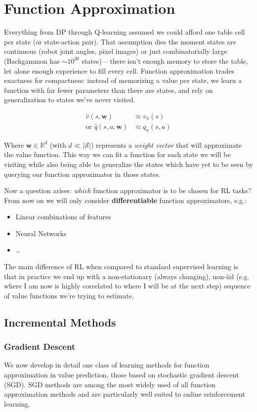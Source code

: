 \section{Function Approximation}
Everything from DP through Q-learning assumed we could afford one table cell per state (or state-action pair). That assumption dies the moment states are continuous (robot joint angles, pixel images) or just combinatorially large (Backgammon has $\sim 10^20$ states) -- there isn't enough memory to store the table, let alone enough experience to fill every cell. Function approximation trades exactness for compactness: instead of memorizing a value per state, we learn a function with far fewer parameters than there are states, and rely on generalization to states we've never visited.

\begin{align*}
    \hat{v}(s,\mathbf{w}) &\approx v_\pi(s) \\
    \text{or }\hat{q}(s, a, \mathbf{w}) &\approx q_\pi(s,a)
\end{align*}

Where $\mathbf{w} \in \mathbb{R}^d$ (with $d \ll \lvert \mathcal{S}\rvert$) represents a \emph{weight vector} that will approximate the value function. This way we can fit a function for each state we will be visiting while also being able to generalize the states which have yet to be seen by querying our function approximator in those states.

Now a question arises: \emph{which} function approximator is to be chosen for RL tasks? From now on we will only consider \textbf{differentiable} function approximators, e.g.:
\begin{itemize}
    \item Linear combinations of features
    \item Neural Networks
    \item \dots
\end{itemize}

The main difference of RL when compared to standard supervised learning is that in practice we end up with a non-stationary (always changing), non-iid (e.g. where I am now is highly correlated to where I will be at the next step) sequence of value functions we're trying to estimate.

\subsection{Incremental Methods}\label{sec:incremental-methods}
\subsubsection{Gradient Descent}
We now develop in detail one class of learning methods for function approximation in value prediction, those based on stochastic gradient descent (SGD). SGD methods are among the most widely used of all function approximation methods and are particularly well suited to online reinforcement learning.

